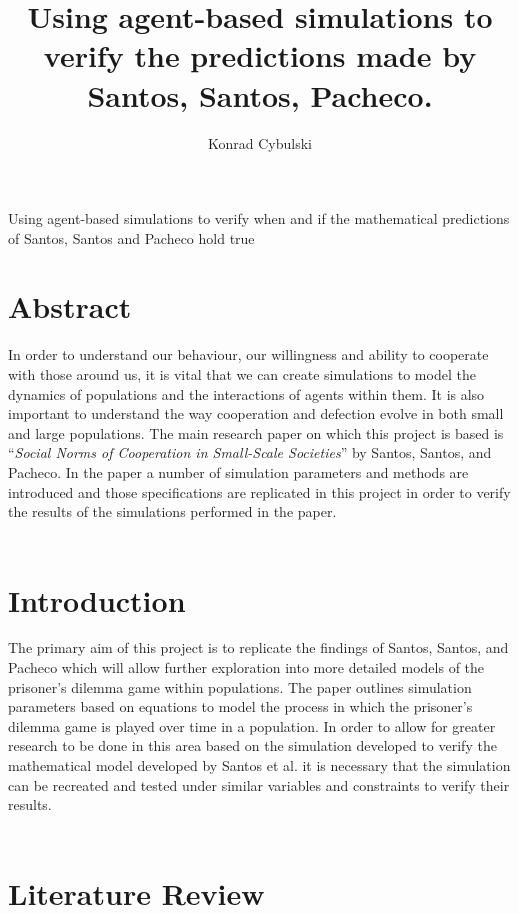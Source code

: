 \documentclass[10pt,a4paper]{article}
\author{Konrad Cybulski}
\title{Using agent-based simulations to verify the predictions made by Santos, Santos, Pacheco.}
\begin{document}
\begin{Large}
Using agent-based simulations to verify when and if the mathematical predictions of
Santos, Santos and Pacheco hold true
\end{Large}

\pagebreak
\tableofcontents
\pagebreak

\section{Abstract}
In order to understand our behaviour, our willingness and ability to cooperate with those around us, it is vital that we can create simulations to model the dynamics of populations and the interactions of agents within them.
It is also important to understand the way cooperation and defection evolve in both small and large populations.
The main research paper on which this project is based is “\textit{Social Norms of Cooperation in Small-Scale Societies}” by Santos, Santos, and Pacheco. 
In the paper a number of simulation parameters and methods are introduced and those specifications are replicated in this project in order to verify the results of the simulations performed in the paper.
\\\\
\section{Introduction}
The primary aim of this project is to replicate the findings of Santos, Santos, and Pacheco which will allow further exploration into more detailed models of the prisoner’s dilemma game within populations. The paper outlines simulation parameters based on equations to model the process in which the prisoner’s dilemma game is played over time in a population. In order to allow for greater research to be done in this area based on the simulation developed to verify the mathematical model developed by Santos et al. it is necessary that the simulation can be recreated and tested under similar variables and constraints to verify their results.
\\\\

\section{Literature Review}
\end{document}
